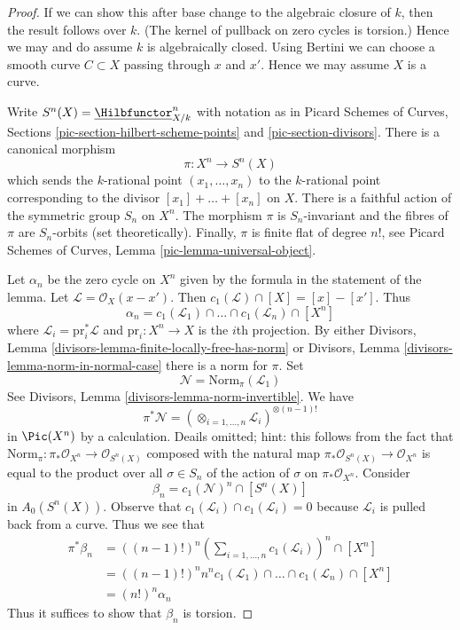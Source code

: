 \begin{proof}
If we can show this after base change to the algebraic closure of $k$,
then the result follows over $k$. (The kernel of pullback on zero cycles
is torsion.) Hence we may and do assume $k$ is algebraically closed.
Using Bertini we can choose a smooth curve $C \subset X$ passing through
$x$ and $x'$. Hence we may assume $X$ is a curve.

\medskip\noindent
Write $S^n(X) = \underline{\Hilbfunctor}^n_{X/k}$ with notation as in
Picard Schemes of Curves, Sections \ref{pic-section-hilbert-scheme-points}
and \ref{pic-section-divisors}. There is a canonical morphism
$$
\pi : X^n \longrightarrow S^n(X)
$$
which sends the $k$-rational point $(x_1, \ldots, x_n)$ to the $k$-rational
point corresponding to the divisor $[x_1] + \ldots + [x_n]$ on $X$.
There is a faithful action of the symmetric group $S_n$ on $X^n$.
The morphism $\pi$ is $S_n$-invariant and the fibres of $\pi$ are
$S_n$-orbits (set theoretically). Finally, $\pi$ is finite flat of
degree $n!$, see Picard Schemes of Curves, Lemma
\ref{pic-lemma-universal-object}.

\medskip\noindent
Let $\alpha_n$ be the zero cycle on $X^n$ given by the formula in the
statement of the lemma. Let $\mathcal{L} = \mathcal{O}_X(x - x')$. Then
$c_1(\mathcal{L}) \cap [X] = [x] - [x']$. Thus
$$
\alpha_n = c_1(\mathcal{L}_1) \cap \ldots \cap c_1(\mathcal{L}_n) \cap [X^n]
$$
where $\mathcal{L}_i = \text{pr}_i^*\mathcal{L}$ and $\text{pr}_i : X^n \to X$
is the $i$th projection. By either
Divisors, Lemma \ref{divisors-lemma-finite-locally-free-has-norm} or
Divisors, Lemma \ref{divisors-lemma-norm-in-normal-case}
there is a norm for $\pi$. Set
$$
\mathcal{N} = \text{Norm}_\pi(\mathcal{L}_1)
$$
See Divisors, Lemma \ref{divisors-lemma-norm-invertible}. We have
$$
\pi^*\mathcal{N} =
(\otimes_{i = 1, \ldots, n} \mathcal{L}_i)^{\otimes (n - 1)!}
$$
in $\Pic(X^n)$ by a calculation. Deails omitted; hint: this follows from
the fact that
$\text{Norm}_\pi : \pi_*\mathcal{O}_{X^n} \to \mathcal{O}_{S^n(X)}$
composed with the natural map $\pi_*\mathcal{O}_{S^n(X)} \to \mathcal{O}_{X^n}$
is equal to the product over all $\sigma \in S_n$ of the action of
$\sigma$ on $\pi_*\mathcal{O}_{X^n}$. Consider
$$
\beta_n = c_1(\mathcal{N})^n \cap [S^n(X)]
$$
in $A_0(S^n(X))$. Observe that $c_1(\mathcal{L}_i) \cap c_1(\mathcal{L}_i) = 0$
because $\mathcal{L}_i$ is pulled back from a curve. Thus we see that
\begin{align*}
\pi^*\beta_n
& =
((n - 1)!)^n
(\sum\nolimits_{i = 1, \ldots, n} c_1(\mathcal{L}_i))^n \cap [X^n] \\
& =
((n - 1)!)^n n^n 
c_1(\mathcal{L}_1) \cap \ldots \cap c_1(\mathcal{L}_n) \cap [X^n] \\
& =
(n!)^n \alpha_n
\end{align*}
Thus it suffices to show that $\beta_n$ is torsion.


\end{proof}
